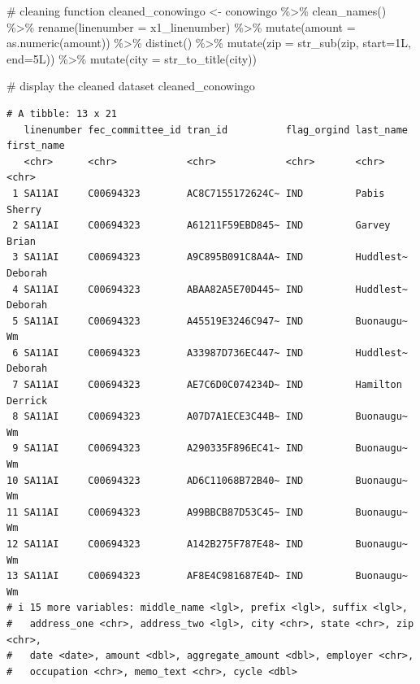 \documentclass[
  letterpaper,
  DIV=11,
  numbers=noendperiod]{scrreprt}
\newenvironment{Shaded}{\begin{snugshade}}{\end{snugshade}}
\newcommand{\AttributeTok}[1]{\textcolor[rgb]{0.40,0.45,0.13}{#1}}
\newcommand{\CommentTok}[1]{\textcolor[rgb]{0.37,0.37,0.37}{#1}}
\newcommand{\FunctionTok}[1]{\textcolor[rgb]{0.28,0.35,0.67}{#1}}
\newcommand{\NormalTok}[1]{\textcolor[rgb]{0.00,0.23,0.31}{#1}}
\newcommand{\OtherTok}[1]{\textcolor[rgb]{0.00,0.23,0.31}{#1}}
\newcommand{\SpecialCharTok}[1]{\textcolor[rgb]{0.37,0.37,0.37}{#1}}
\begin{document}
\begin{Shaded}
\begin{Highlighting}[]
\CommentTok{\# cleaning function}
\NormalTok{cleaned\_conowingo }\OtherTok{\textless{}{-}}\NormalTok{ conowingo }\SpecialCharTok{\%\textgreater{}\%}
  \FunctionTok{clean\_names}\NormalTok{() }\SpecialCharTok{\%\textgreater{}\%}
  \FunctionTok{rename}\NormalTok{(}\AttributeTok{linenumber =}\NormalTok{ x1\_linenumber) }\SpecialCharTok{\%\textgreater{}\%}
  \FunctionTok{mutate}\NormalTok{(}\AttributeTok{amount =} \FunctionTok{as.numeric}\NormalTok{(amount)) }\SpecialCharTok{\%\textgreater{}\%}
  \FunctionTok{distinct}\NormalTok{() }\SpecialCharTok{\%\textgreater{}\%}
  \FunctionTok{mutate}\NormalTok{(}\AttributeTok{zip =} \FunctionTok{str\_sub}\NormalTok{(zip, }\AttributeTok{start=}\NormalTok{1L, }\AttributeTok{end=}\NormalTok{5L)) }\SpecialCharTok{\%\textgreater{}\%}
  \FunctionTok{mutate}\NormalTok{(}\AttributeTok{city =} \FunctionTok{str\_to\_title}\NormalTok{(city))}


\CommentTok{\# display the cleaned dataset}
\NormalTok{cleaned\_conowingo}
\end{Highlighting}
\end{Shaded}

\begin{verbatim}
# A tibble: 13 x 21
   linenumber fec_committee_id tran_id          flag_orgind last_name first_name
   <chr>      <chr>            <chr>            <chr>       <chr>     <chr>     
 1 SA11AI     C00694323        AC8C7155172624C~ IND         Pabis     Sherry    
 2 SA11AI     C00694323        A61211F59EBD845~ IND         Garvey    Brian     
 3 SA11AI     C00694323        A9C895B091C8A4A~ IND         Huddlest~ Deborah   
 4 SA11AI     C00694323        ABAA82A5E70D445~ IND         Huddlest~ Deborah   
 5 SA11AI     C00694323        A45519E3246C947~ IND         Buonaugu~ Wm        
 6 SA11AI     C00694323        A33987D736EC447~ IND         Huddlest~ Deborah   
 7 SA11AI     C00694323        AE7C6D0C074234D~ IND         Hamilton  Derrick   
 8 SA11AI     C00694323        A07D7A1ECE3C44B~ IND         Buonaugu~ Wm        
 9 SA11AI     C00694323        A290335F896EC41~ IND         Buonaugu~ Wm        
10 SA11AI     C00694323        AD6C11068B72B40~ IND         Buonaugu~ Wm        
11 SA11AI     C00694323        A99BBCB87D53C45~ IND         Buonaugu~ Wm        
12 SA11AI     C00694323        A142B275F787E48~ IND         Buonaugu~ Wm        
13 SA11AI     C00694323        AF8E4C981687E4D~ IND         Buonaugu~ Wm        
# i 15 more variables: middle_name <lgl>, prefix <lgl>, suffix <lgl>,
#   address_one <chr>, address_two <lgl>, city <chr>, state <chr>, zip <chr>,
#   date <date>, amount <dbl>, aggregate_amount <dbl>, employer <chr>,
#   occupation <chr>, memo_text <chr>, cycle <dbl>
\end{verbatim}
\end{document}
